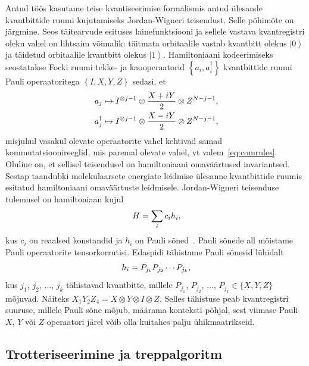 \documentclass[12pt]{report}
\def\cparen#1{\left\{#1\right\}}
\def\ket#1{\left|#1\right>}
\begin{document}
Antud töös kasutame teise kvantiseerimise formalismis antud ülesande kvantbittide ruumi kujutamiseks Jordan-Wigneri teisendust.
Selle põhimõte on järgmine.
Seos täitearvude esituses lainefunktsiooni ja sellele vastava kvantregistri oleku vahel on lihtsaim võimalik: täitmata orbitaalile vastab kvantbitt olekus \(\ket{0}\) ja täidetud orbitaalile kvantbitt olekus \(\ket{1}\).
Hamiltoniaani kodeerimiseks seostatakse Focki ruumi tekke- ja kaooperaatorid \(\cparen{a_i, a_i^\dagger}\) kvantbittide ruumi Pauli operaatoritega \(\cparen{I, X, Y, Z}\) sedasi, et
\begin{align}
    a_j &\mapsto I^{\otimes j-1} \otimes \frac{X+iY}{2} \otimes Z^{N-j-1} \rlap{,} \\
    a_j^\dagger &\mapsto I^{\otimes j-1} \otimes \frac{X-iY}{2} \otimes Z^{N-j-1} \rlap{,}
\end{align}
misjuhul vasakul olevate operaatorite vahel kehtivad samad kommutatsioonireeglid, mis paremal olevate vahel, vt valem~\eqref{eq:comrules}.
Oluline on, et sellisel teisendusel on hamiltoniaani omaväärtused invariantsed.
Sestap taandubki molekulaarsete energiate leidmise ülesanne kvantbittide ruumis esitatud hamiltoniaani omaväärtuste leidmisele.
Jordan-Wigneri teisenduse tulemusel on hamiltoniaan kujul
\begin{align}\label{eq:paulisum}
    H = \sum_i c_i h_i \rlap{,}
\end{align}
kus \(c_i\) on reaalsed konstandid ja \(h_i\) on Pauli sõned~\cite{whitfield+etal2011, mcardle+etal}.
Pauli sõnede all mõistame Pauli operaatorite tensorkorrutisi.
Edaspidi tähistame Pauli sõnesid lühidalt
\begin{equation} h_i=P_{j_1}P_{j_2}\cdots P_{j_k} \rlap{,}\end{equation}
kus \(j_1\), \(j_2\), $\ldots$, \(j_k\) tähistavad kvantbitte, millele \(P_{j_1}\), \(P_{j_2}\), \(\ldots\), \(P_{j_k}\in\{X,Y,Z\}\) mõjuvad.
Näiteks \(X_1Y_2Z_4=X\otimes Y\otimes I\otimes Z.\)
Selles tähistuse peab kvantregistri suuruse, millele Pauli sõne mõjub, määrama konteksti põhjal, sest viimase Pauli \(X\), \(Y\) või \(Z\) operaatori järel võib olla kuitahes palju ühikmaatrikseid.

\subsection{Trotteriseerimine ja treppalgoritm}\label{sec:qcirc}
\end{document}
